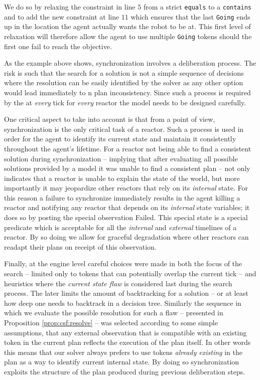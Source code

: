 We do so by relaxing the constraint in line $5$ from a strict
\texttt{equals} to a \texttt{contains} and to add the new constraint
at line $11$ which ensures that the last \texttt{Going} ends up in the
location the agent actually wants the robot to be at. This first level
of relaxation will therefore allow the agent to use multiple
\texttt{Going} tokens should the first one fail to reach the
objective.  

As the example above shows, synchronization involves a deliberation
process. The risk is such that the search for a solution is not a
simple sequence of decisions where the resolution can be easily
identified by the solver as any other option would lead immediately to
n plan inconsistency. Since such a process is required by the \rx at
\emph{every} tick for \emph{every} reactor the model needs to be
designed carefully.

One critical aspect to take into account is that from a \rx point of
view, synchronization is the only critical task of a reactor. Such a
process is used in order for the agent to identify its current state
and maintain it consistently throughout the agent's lifetime. For a
reactor not being able to find a consistent solution during
synchronization -- implying that after evaluating all possible
solutions provided by a model it was unable to find a consistent plan
-- not only indicates that a reactor is unable to explain the state of
the world, but more importantly it may jeopardize other reactors that
rely on its {\em internal} state. For this reason a failure to
synchronize immediately results in the \rx agent killing a reactor and
notifying any reactor that depends on its {\em internal} state
variables; it does so by posting the special observation
\textsf{Failed}. This special state is a special predicate which is
acceptable for all the {\em internal} and {\em external} timelines of
a \eu reactor.  By so doing we allow for graceful degradation where
other reactors can readapt their plans on receipt of this observation.

Finally, at the engine level careful choices were made in both the
focus of the search -- limited only to tokens that can potentially
overlap the current tick -- and heuristics where the {\em current
  state flaw} is considered last during the search process. The later
limits the amount of backtracking for a solution -- or at least how
deep one needs to backtrack in a decision tree.  Similarly the
sequence in which we evaluate the possible resolution for such a flaw
-- presented in Proposition \ref{prop:csf:resolve} -- was selected
according to some simple assumptions, that any external observation
that is compatible with an existing token in the current plan reflects
the execution of the plan itself. In other words this means that our
solver always prefers to use tokens \emph{already existing} in the
plan as a way to identify current internal state. By doing so
synchronization exploits the structure of the plan produced during
previous deliberation steps.

